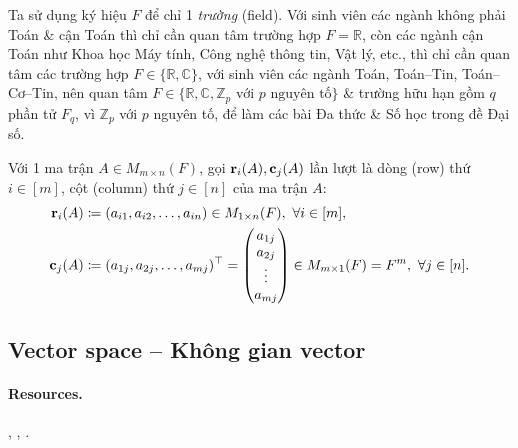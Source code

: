 \documentclass{article}
\begin{document}
Ta sử dụng ký hiệu $F$ để chỉ 1 {\it trường} (field). Với sinh viên các ngành không phải Toán \& cận Toán thì chỉ cần quan tâm trường hợp $F = \mathbb{R}$, còn các ngành cận Toán như Khoa học Máy tính, Công nghệ thông tin, Vật lý, etc., thì chỉ cần quan tâm các trường hợp $F\in\{\mathbb{R},\mathbb{C}\}$, với sinh viên các ngành Toán, Toán--Tin, Toán--Cơ--Tin, nên quan tâm $F\in\{\mathbb{R},\mathbb{C},\mathbb{Z}_p\mbox{ với } p \mbox{ nguyên tố}\}$ \& trường hữu hạn gồm $q$ phần tử $F_q$, vì $\mathbb{Z}_p$ với $p$ nguyên tố, để làm các bài Đa thức \& Số học trong đề Đại số.

Với 1 ma trận $A\in M_{m\times n}(F)$, gọi ${\bf r}_i(A),{\bf c}_j(A)$ lần lượt là dòng (row) thứ $i\in[m]$, cột (column) thứ $j\in[n]$ của ma trận $A$:
\begin{align*}
	{\bf r}_i(A)&\coloneqq(a_{i1},a_{i2},\ldots,a_{in})\in M_{1\times n}(F),\ \forall i\in[m],\\
	{\bf c}_j(A)&\coloneqq(a_{1j},a_{2j},\ldots,a_{mj})^\top = \begin{pmatrix}
		a_{1j}\\a_{2j}\\\vdots\\a_{mj}
	\end{pmatrix}\in M_{m\times1}(F) = F^m,\ \forall j\in[n].
\end{align*}


\subsection{Vector space -- Không gian vector}

\paragraph{Resources.} \cite[Chương 1]{Hoa_linear_algebra}, \cite{Hung_linear_algebra}, \cite{Trung_linear_algebra}.
\end{document}
